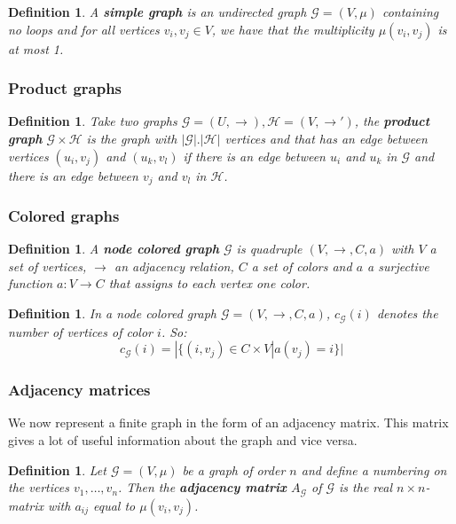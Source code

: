 \documentclass[a4paper,11pt]{report}
\newtheorem{definition}[theorem]{Definition}
\newcommand{\graf}{\mathscr{G}}
\newcommand{\grafeen}{\mathscr{H}}
\begin{document}
  


\begin{definition} A \textbf{simple graph} is an undirected graph $\graf=(V,\mu)$ containing no loops and for all vertices $v_i, v_j \in V$, we have that the multiplicity
 $\mu(v_i,v_j)$ is at most 1.\end{definition}
 
 \subsubsection{Product graphs}
 \begin{definition}\label{productgraph}
   Take two graphs $\graf=(U,\to), \grafeen=(V,\to')$, the \textbf{product graph} $\graf \times \grafeen$ 
   is the graph with $|\graf|.|\grafeen|$ vertices and that has an edge between 
   vertices $(u_i, v_j)$ and $(u_k, v_l)$ if there is an edge between $u_i$ and $u_k$ in $\graf$ and there is an 
   edge between $v_j$ and $v_l$ in $\grafeen$. 
 \end{definition}
 
 \subsubsection{Colored graphs}\label{colored}
 \begin{definition}\label{defcolor}
   A \textbf{node colored graph} $\graf$ is quadruple  $(V, \to, C, a)$ with $V$ 
   a set of vertices, $\to$ an adjacency relation, $C$ a set of colors and $a$ 
   a surjective function $a: V \to C$ that assigns to each vertex one color.
 \end{definition}
 \begin{definition}
   In a node colored graph $\graf = (V, \to, C, a) $, $c_\graf(i)$ denotes the number of vertices of 
   color $i$. So:
   $$c_\graf(i) = |\{(i, v_j) \in C \times V | a(v_j) = i\}|$$
 \end{definition}

 \subsubsection{Adjacency matrices}
 We now represent a finite graph in the form of an adjacency matrix. This 
 matrix gives a lot of useful information about the graph and vice versa.
 
 
 \begin{definition}
 Let $\graf=(V, \mu)$ be a graph of order $n$ and define a numbering on the 
 vertices $v_1,\ldots, v_n$. Then the \textbf{adjacency matrix} $A_\graf$ of $\graf$ is the real
 $n\times n$-matrix with $a_{ij}$ equal to $\mu(v_i, v_j)$.
 \end{definition}
 
\end{document}

